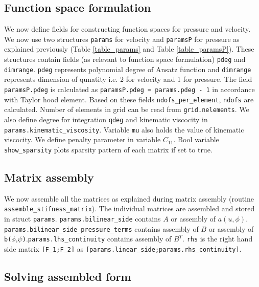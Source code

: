 \documentclass[a4paper]{book}
\begin{document}
\subsection{Function space formulation}

We now define fields for constructing function spaces for pressure and velocity. We now use two structures \verb|params| for velocity and \verb|paramsP| for pressure as explained previously (Table \ref{table_params} and Table \ref{table_paramsP}). These structures contain fields (as relevant to function space formulation) \verb|pdeg| and \verb|dimrange|. \verb|pdeg| represents polynomial degree of Ansatz function and \verb|dimrange| represents  dimension of qunatity i.e. 2 for velocity and 1 for pressure. The field \verb|paramsP.pdeg| is calculated as \verb|paramsP.pdeg = params.pdeg - 1| in accordance with Taylor hood element. Based on these fields \verb|ndofs_per_element|, \verb|ndofs| are calculated. Number of elements in grid can be read from \verb|grid.nelements|. We also define degree for integration \verb|qdeg| and kinematic viscocity in \linebreak \verb|params.kinematic_viscosity|. Variable \verb|mu| also holds the value of kinematic viscocity. We define penalty parameter in variable $C_{11}$. Bool variable \verb|show_sparsity| plots sparsity pattern of each matrix if set to true.\\

\subsection{Matrix assembly}

We now assemble all the matrices as explained during matrix assembly (routine \verb|assemble_stifness_matrix|). The individual matrices are assembled and stored in struct \verb|params|. \verb|params.bilinear_side| contains $A$ or assembly of $a(u,\phi)$. \verb|params.bilinear_side_pressure_terms| contains assembly of $B$ or assembly of \verb|b(|$\phi$,$\psi$\verb|)|.\verb|params.lhs_continuity| contains assembly of $B^T$. \verb|rhs| is the right hand side matrix \verb|[F_1;F_2]| as \linebreak \verb|[params.linear_side;params.rhs_continuity]|. \\

\subsection{Solving assembled form}
\end{document}
